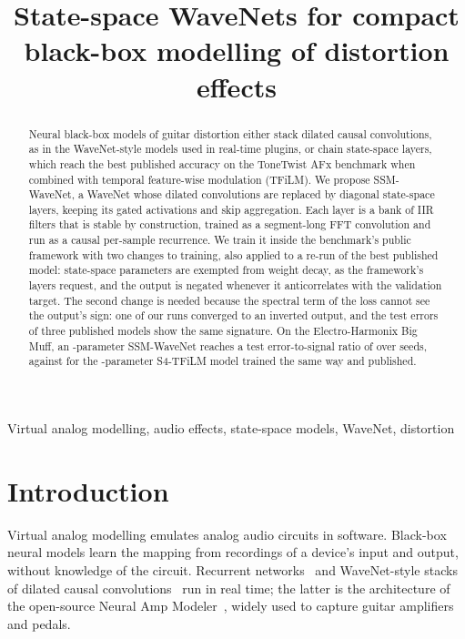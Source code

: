 \documentclass{article}
\title{State-space WaveNets for compact black-box modelling of distortion effects}
\begin{document}
\ninept
\maketitle

\begin{abstract}
Neural black-box models of guitar distortion either stack dilated causal
convolutions, as in the WaveNet-style models used in real-time plugins, or
chain state-space layers, which reach the best published accuracy on the
ToneTwist AFx benchmark when combined with temporal feature-wise modulation
(TFiLM). We propose SSM-WaveNet, a WaveNet whose dilated convolutions are
replaced by diagonal state-space layers, keeping its gated activations and skip
aggregation. Each layer is a bank of IIR filters that is stable by construction,
trained as a segment-long FFT convolution and run as a causal per-sample
recurrence. We train it inside the benchmark's public framework with two changes
to training, also applied to a re-run of the best published model: state-space
parameters are exempted from weight decay, as the framework's layers request,
and the output is negated whenever it anticorrelates with the validation target.
The second change is needed because the spectral term of the loss cannot see the
output's sign: one of our runs converged to an inverted output, and the test
errors of three published models show the same signature. On the Electro-Harmonix Big Muff,
an \SSMparams-parameter SSM-WaveNet reaches a test error-to-signal ratio of
\SSMesrMeanStd{} over \SSMn{} seeds, against \ChangesSFourTFLesrMeanStd{} for
the \PubSFourTFLparams-parameter S4-TFiLM model trained the same way and
\PubSFourTFLesr{} published.
\end{abstract}

\begin{keywords}
Virtual analog modelling, audio effects, state-space models, WaveNet, distortion
\end{keywords}

\section{Introduction}
\label{sec:intro}

Virtual analog modelling emulates analog audio circuits in software. Black-box
neural models learn the mapping from recordings of a device's input and output,
without knowledge of the circuit. Recurrent networks~\cite{wright2019realtime,
wright2020applsci} and WaveNet-style stacks of dilated causal
convolutions~\cite{vandenoord2016wavenet, damskagg2019icassp, damskagg2019smc}
run in real time; the latter is the architecture of the open-source Neural Amp
Modeler~\cite{atkinson2023nam}, widely used to capture guitar amplifiers and
pedals.
\end{document}
